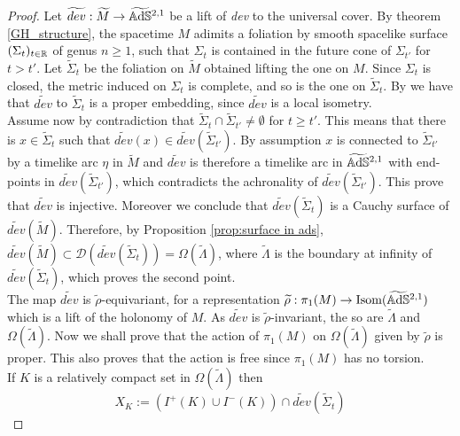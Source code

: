 \begin{proof}
    Let $\widetilde{dev}: \widetilde{M} \to \widetilde{\mathbb{A}\mathrm{d}\mathbb{S}}{}^{2,1}$ be a lift of \textit{dev} to the universal cover. By theorem \ref{GH_structure}, the spacetime $M$ adimits a foliation by smooth spacelike surface $(\Sigma_t)_{t\in\mathbb{R}}$ of genus $n\geq 1$, such that $\Sigma_t$ is contained in the future cone of $\Sigma_{t'}$ for $t > t'$. Let $\widetilde{\Sigma}_t$ be the foliation on $\widetilde{M}$ obtained lifting the one on $M$. Since $\Sigma_t$ is closed, the metric induced on $\Sigma_t$ is complete, and so is the one on $\widetilde{\Sigma}_t$. By  we have that $\widetilde{dev}$ to $\widetilde{\Sigma}_t$ is a proper embedding, since $\widetilde{dev}$ is a local isometry.\\
    Assume now by contradiction that $\widetilde{\Sigma}_t \cap \widetilde{\Sigma}_{t'} \neq \emptyset$ for $t \geq t'$. This means that there is $x \in \widetilde{\Sigma}_t$ such that $\widetilde{dev}(x) \in \widetilde{dev}(\widetilde{\Sigma}_{t'})$. By assumption $x$ is connected to $\widetilde{\Sigma}_{t'}$ by a timelike arc $\eta$ in $\widetilde{M}$ and $\widetilde{dev}$ is therefore a timelike arc in $\widetilde{\mathbb{A}\mathrm{d}\mathbb{S}}{}^{2,1}$ with end-points in $\widetilde{dev}(\widetilde{\Sigma}_{t'})$, which contradicts the achronality of $\widetilde{dev}(\widetilde{\Sigma}_{t'})$. This prove that $\widetilde{dev}$ is injective. Moreover we conclude that $\widetilde{dev}(\widetilde{\Sigma}_t)$ is a Cauchy surface of $\widetilde{dev}(\widetilde{M})$. Therefore, by Proposition \ref{prop:surface in ads}, $\widetilde{dev}(\widetilde{M}) \subset \mathcal{D}(\widetilde{dev}(\widetilde{\Sigma}_t)) = \Omega(\widetilde{\Lambda})$, where $\widetilde{\Lambda}$ is the boundary at infinity of $\widetilde{dev}(\widetilde{\Sigma}_t)$, which proves the second point.\\
    The map $\widetilde{dev}$ is $\widetilde{\rho}$-equivariant, for a representation $\widetilde{\rho} : \pi_1(M) \to \text{Isom}(\widetilde{\mathbb{A}\mathrm{d}\mathbb{S}}{}^{2,1})$ which is a lift of the holonomy of $M$. As $\widetilde{dev}$ is $\widetilde{\rho}$-invariant, the so are $\widetilde{\Lambda}$ and $\Omega(\widetilde{\Lambda})$. Now we shall prove that the action of $\pi_1(M)$ on $\Omega(\widetilde{\Lambda})$ given by $\widetilde{\rho}$ is proper. This also proves that the action is free since $\pi_1(M)$ has no torsion.\\
    If $K$ is a relatively compact set in $\Omega(\widetilde{\Lambda})$ then
    \[
        X_K := (I^+(K) \cup I^-(K)) \cap \widetilde{dev}(\widetilde{\Sigma}_t)
    \]

\end{proof}
